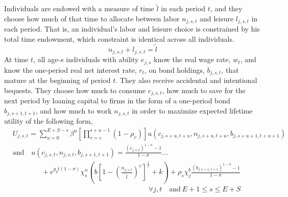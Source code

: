 \documentclass[letterpaper,12pt]{article}
\theoremstyle{definition}
\begin{document}
\begin{spacing}{1.5}
    Individuals are endowed with a measure of time $\tilde{l}$ in each period $t$, and they choose how much of that time to allocate between labor $n_{j,s,t}$ and leisure $l_{j,s,t}$ in each period. That is, an individual's labor and leisure choice is constrained by his total time endowment, which constraint is identical across all individuals.
    \begin{equation}\label{EqLabConstr}
      n_{j,s,t} + l_{j,s,t} = \tilde{l}
    \end{equation}
    At time $t$, all age-$s$ individuals with ability $e_{j,s}$ know the real wage rate, $w_t$, and know the one-period real net interest rate, $r_t$, on bond holdings, $b_{j,s,t}$, that mature at the beginning of period $t$. They also receive accidental and intentional bequests. They choose how much to consume $c_{j,s,t}$, how much to save for the next period by loaning capital to firms in the form of a one-period bond $b_{j,s+1,t+1}$, and how much to work $n_{j,s,t}$ in order to maximize expected lifetime utility of the following form,
    \begin{equation}\label{EqUtilMax}
      \begin{split}
        &U_{j,s,t} = \sum_{u=0}^{E+S-s}\beta^u\left[\prod_{v=s}^{s+u-1}(1-\rho_v)\right] u\left(c_{j,s+u,t+u},n_{j,s+u,t+u},b_{j,s+u+1,t+u+1}\right) \\
        &\text{and} \quad u\left(c_{j,s,t},n_{j,s,t},b_{j,s+1,t+1}\right) = \frac{\left(c_{j,s,t}\right)^{1-\sigma} - 1}{1-\sigma} ... \\
        &\qquad\qquad + e^{g_y t(1-\sigma)}\chi^n_s\left(b\left[1 - \left(\frac{n_{j,s,t}}{\tilde{l}}\right)^\upsilon\right]^\frac{1}{\upsilon} + k\right) + \rho_s\chi^b_j\frac{\left(b_{j,s+1,t+1}\right)^{1-\sigma} - 1}{1-\sigma} \\
        &\quad\quad\quad\quad\quad\quad\quad\quad\quad\quad\quad\quad\quad\quad\quad\quad\quad\quad\quad\forall j,t\quad\text{and}\:E+1\leq s\leq E+S
      \end{split}
    \end{equation}

\end{spacing}
\end{document}
